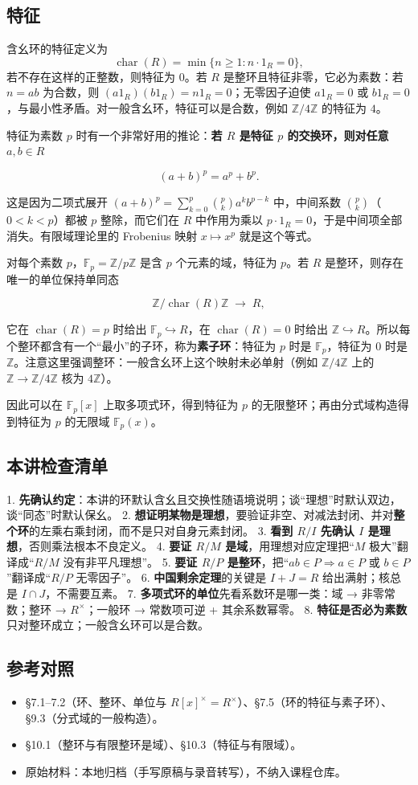 \subsection{特征}


含幺环的特征定义为
\[\operatorname{char}(R)=\min\{n\ge1:n\cdot1_R=0\},\]
若不存在这样的正整数，则特征为 $0$。若 $R$ 是整环且特征非零，它必为素数：若 $n=ab$ 为合数，则 $(a1_R)(b1_R)=n1_R=0$；无零因子迫使 $a1_R=0$ 或 $b1_R=0$，与最小性矛盾。对一般含幺环，特征可以是合数，例如 $\mathbb Z/4\mathbb Z$ 的特征为 $4$。

特征为素数 $p$ 时有一个非常好用的推论：\textbf{若 $R$ 是特征 $p$ 的交换环，则对任意 $a,b\in R$}

\[
(a+b)^p=a^p+b^p .
\]

这是因为二项式展开 $(a+b)^p=\sum_{k=0}^p\binom pk a^kb^{p-k}$ 中，中间系数 $\binom pk$（$0<k<p$）都被 $p$ 整除，而它们在 $R$ 中作用为乘以 $p\cdot1_R=0$，于是中间项全部消失。有限域理论里的 Frobenius 映射 $x\mapsto x^p$ 就是这个等式。

对每个素数 $p$，$\mathbb F_p=\mathbb Z/p\mathbb Z$ 是含 $p$ 个元素的域，特征为 $p$。若 $R$ 是整环，则存在唯一的单位保持单同态

\[
\mathbb Z/\operatorname{char}(R)\mathbb Z\;\longrightarrow\;R,
\]

它在 $\operatorname{char}(R)=p$ 时给出 $\mathbb F_p\hookrightarrow R$，在 $\operatorname{char}(R)=0$ 时给出 $\mathbb Z\hookrightarrow R$。所以每个整环都含有一个“最小”的子环，称为\textbf{素子环}：特征为 $p$ 时是 $\mathbb F_p$，特征为 $0$ 时是 $\mathbb Z$。注意这里强调整环：一般含幺环上这个映射未必单射（例如 $\mathbb Z/4\mathbb Z$ 上的 $\mathbb Z\to\mathbb Z/4\mathbb Z$ 核为 $4\mathbb Z$）。

因此可以在 $\mathbb F_p[x]$ 上取多项式环，得到特征为 $p$ 的无限整环；再由分式域构造得到特征为 $p$ 的无限域 $\mathbb F_p(x)$。

\subsection{本讲检查清单}


1. \textbf{先确认约定}：本讲的环默认含幺且交换性随语境说明；谈“理想”时默认双边，谈“同态”时默认保幺。
2. \textbf{想证明某物是理想}，要验证非空、对减法封闭、并对\textbf{整个环}的左乘右乘封闭，而不是只对自身元素封闭。
3. \textbf{看到 $R/I$ 先确认 $I$ 是理想}，否则乘法根本不良定义。
4. \textbf{要证 $R/M$ 是域}，用理想对应定理把“$M$ 极大”翻译成“$R/M$ 没有非平凡理想”。
5. \textbf{要证 $R/P$ 是整环}，把“$ab\in P\Rightarrow a\in P$ 或 $b\in P$”翻译成“$R/P$ 无零因子”。
6. \textbf{中国剩余定理}的关键是 $I+J=R$ 给出满射；核总是 $I\cap J$，不需要互素。
7. \textbf{多项式环的单位}先看系数环是哪一类：域 → 非零常数；整环 → $R^\times$；一般环 → 常数项可逆 + 其余系数幂零。
8. \textbf{特征是否必为素数}只对整环成立；一般含幺环可以是合数。

\subsection{参考对照}


\begin{itemize}
\item [DF] §7.1--7.2（环、整环、单位与 $R[x]^\times=R^\times$）、§7.5（环的特征与素子环）、§9.3（分式域的一般构造）。
\item [DS] §10.1（整环与有限整环是域）、§10.3（特征与有限域）。
\item 原始材料：本地归档（手写原稿与录音转写），不纳入课程仓库。
\end{itemize}
